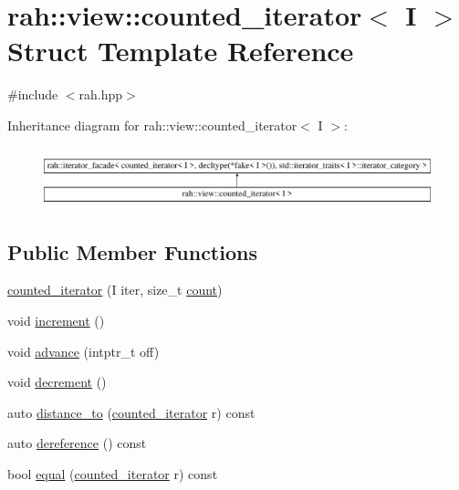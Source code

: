 \hypertarget{structrah_1_1view_1_1counted__iterator}{}\section{rah\+::view\+::counted\+\_\+iterator$<$ I $>$ Struct Template Reference}
\label{structrah_1_1view_1_1counted__iterator}


{\ttfamily \#include $<$rah.\+hpp$>$}

Inheritance diagram for rah\+::view\+::counted\+\_\+iterator$<$ I $>$\+:\begin{figure}[H]
\begin{center}
\leavevmode
\includegraphics[height=1.750000cm]{structrah_1_1view_1_1counted__iterator}
\end{center}
\end{figure}
\subsection*{Public Member Functions}
\begin{DoxyCompactItemize}
\item 
\mbox{\hyperlink{structrah_1_1view_1_1counted__iterator_aa26e9c047e175303c296758316634890}{counted\+\_\+iterator}} (I iter, size\+\_\+t \mbox{\hyperlink{namespacerah_aa528865cc4a45d4eb276329554f16b4b}{count}})
\item 
void \mbox{\hyperlink{structrah_1_1view_1_1counted__iterator_a8113f67743f49650c0b4c872bcfd560e}{increment}} ()
\item 
void \mbox{\hyperlink{structrah_1_1view_1_1counted__iterator_abef44b581abb0c70a79dbd6a61ccd200}{advance}} (intptr\+\_\+t off)
\item 
void \mbox{\hyperlink{structrah_1_1view_1_1counted__iterator_abeb34df8feb243fce3eec27d45b19aa2}{decrement}} ()
\item 
auto \mbox{\hyperlink{structrah_1_1view_1_1counted__iterator_afee4b1d8525979cc4b711eba9b524f1d}{distance\+\_\+to}} (\mbox{\hyperlink{structrah_1_1view_1_1counted__iterator}{counted\+\_\+iterator}} r) const
\item 
auto \mbox{\hyperlink{structrah_1_1view_1_1counted__iterator_a35446b4aba49b230600a841c3269fbc3}{dereference}} () const
\item 
bool \mbox{\hyperlink{structrah_1_1view_1_1counted__iterator_a71ee9eea167eec16b04373885dbff741}{equal}} (\mbox{\hyperlink{structrah_1_1view_1_1counted__iterator}{counted\+\_\+iterator}} r) const
\end{DoxyCompactItemize}
